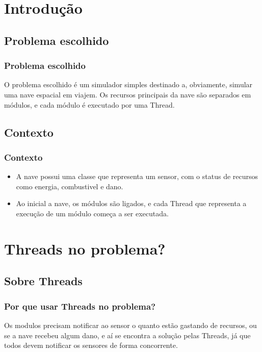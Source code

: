 \section{Introdução}

	\subsection{Problema escolhido}

	\begin{frame}
	\frametitle{Problema escolhido}
		 \begin{block}{}
				O problema escolhido é um simulador simples destinado a, obviamente, simular uma nave espacial em viajem. Os recursos principais da nave são separados em módulos, e cada módulo é executado por uma Thread.
		 \end{block}
	\end{frame}

	\subsection{Contexto}
	\begin{frame}
	\frametitle{Contexto}
		 \begin{block}{}
				\begin{itemize}
			    \item A nave possui uma classe que representa um sensor, com o status de recursos como energia, combustivel e dano.
					\pause
					\item Ao inicial a nave, os módulos são ligados, e cada Thread que representa a execução de um módulo começa a ser executada.
				\end{itemize}
		 \end{block}
	\end{frame}

\section{Threads no problema?}
	\subsection{Sobre Threads}
	\begin{frame}
	\frametitle{Por que usar Threads no problema?}
		 \begin{block}{}
		    Os modulos precisam notificar ao sensor o quanto estão gastando de recursos, ou se a nave recebeu algum dano, e aí se encontra a solução pelas Threads, já que todos devem notificar os sensores de forma concorrente.
		 \end{block}
	\end{frame}


